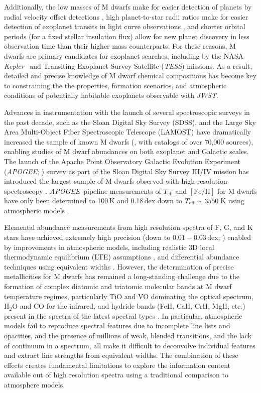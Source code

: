 \documentclass[twocolumn]{aastex62}
\newcommand{\apogee}{\textsl{APOGEE}}
\newcommand{\kepler}{\textsl{Kepler}}
\newcommand{\tess}{\textsl{TESS}}
\newcommand{\teff}{T_{\mathrm{eff}}}
\newcommand{\feh}{[{\mathrm{Fe}/\mathrm{H}}]}
\begin{document}
Additionally, the low masses of M dwarfs make for easier detection of planets by radial velocity offset detections \citep{Trifonov:2018}, high planet-to-star radii ratios make for easier detection of exoplanet transits in light curve observations \citep{Nutzman:2008}, and shorter orbital periods (for a fixed stellar insulation flux) allow for new planet discovery in less observation time than their higher mass counterparts. For these reasons, M dwarfs are primary candidates for exoplanet searches, including by the NASA \kepler\ \citep[e.g.,][]{Dressing2015} and Transiting Exoplanet Survey Satellite (\tess) \citep[e.g.,][]{Muirhead:2018} missions. As a result, detailed and precise knowledge of M dwarf chemical compositions has become key to constraining the the properties, formation scenarios, and atmospheric conditions of potentially habitable exoplanets observable with {\sl JWST}.

Advances in instrumentation with the launch of several spectroscopic surveys in the past decade, such as the Sloan Digital Sky Survey (SDSS), and the Large Sky Area Multi-Object Fiber Spectroscopic Telescope (LAMOST) have dramatically increased the sample of known M dwarfs (\citealt{West:2011}, \citealt{Guo:2015} with catalogs of over 70,000 sources), enabling studies of M dwarf abundances on both exoplanet and Galactic scales.
The launch of the Apache Point Observatory Galactic Evolution Experiment (\apogee; \citealt{Majewski:2015}) survey as part of the Sloan Digital Sky Survey III/IV mission \citep{Eisenstein:2011,Blanton:2017} has introduced the largest sample of M dwarfs observed with high resolution spectroscopy \citep{Desphande:2013}. \apogee\ pipeline measurements of $\teff$ and $\feh$ \citep{Perez:2016} for M dwarfs have only been determined to 100\,K and 0.18\,dex down to $T_{\rm eff}\sim3550\,$K using atmospheric models \citep{Schmidt:2016}. 

Elemental abundance measurements from high resolution spectra of F, G, and K stars have achieved extremely high precision (down to $0.01-0.03$\,dex; \citealt{Nissen2018}) enabled by improvements in atmospheric models, including realistic 3D local thermodynamic equilibrium (LTE) assumptions \citep{Asplund2005}, and differential abundance techniques using equivalent widths \citep{Bedell2014}. However, the determination of precise metallicities for M dwarfs has remained a long-standing challenge due to the formation of complex diatomic and triatomic molecular bands at M dwarf temperature regimes, particularly TiO and VO dominating the optical spectrum, H$_2$O and CO for the infrared, and hydride bands (FeH, CaH, CrH, MgH, etc.) present in the spectra of the latest spectral types \citep{Allard1997}.
In particular, atmospheric models fail to reproduce spectral features \citep[e.g.,][]{Mann:2013c} due to incomplete line lists and opacities, and the presence of millions of weak, blended transitions, and the lack of continuum in a spectrum, all make it difficult to deconvolve individual features and extract line strengths from equivalent widths. The combination of these effects creates fundamental limitations to explore the information content available out of high resolution spectra using a traditional comparison to atmosphere models.
\end{document}
